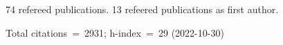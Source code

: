 74 refereed publications. 13 refeered publications as first author.

Total citations~=~2931; h-index~=~29 (2022-10-30)